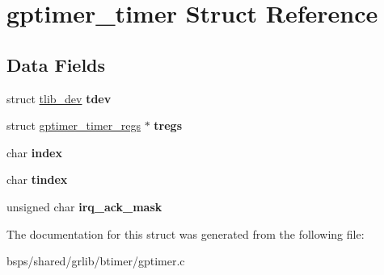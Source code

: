 \hypertarget{structgptimer__timer}{}\section{gptimer\+\_\+timer Struct Reference}
\label{structgptimer__timer}
\subsection*{Data Fields}
\begin{DoxyCompactItemize}
\item 
\mbox{\label{structgptimer__timer_ab41bb2e2dc0964e04e14f753950e7dee}} 
struct \mbox{\hyperlink{structtlib__dev}{tlib\+\_\+dev}} {\bfseries tdev}
\item 
\mbox{\label{structgptimer__timer_a2349b1c48d2ac3ccc6bfed19a2bf25a6}} 
struct \mbox{\hyperlink{structgptimer__timer__regs}{gptimer\+\_\+timer\+\_\+regs}} $\ast$ {\bfseries tregs}
\item 
\mbox{\label{structgptimer__timer_a3f9b5b12b71be1b685b4619997cfff56}} 
char {\bfseries index}
\item 
\mbox{\label{structgptimer__timer_a9e012fda6973dc771fe9d2905486328d}} 
char {\bfseries tindex}
\item 
\mbox{\label{structgptimer__timer_a51b096c84276d9c5ddf550d30e977fed}} 
unsigned char {\bfseries irq\+\_\+ack\+\_\+mask}
\end{DoxyCompactItemize}


The documentation for this struct was generated from the following file\+:\begin{DoxyCompactItemize}
\item 
bsps/shared/grlib/btimer/gptimer.\+c\end{DoxyCompactItemize}
